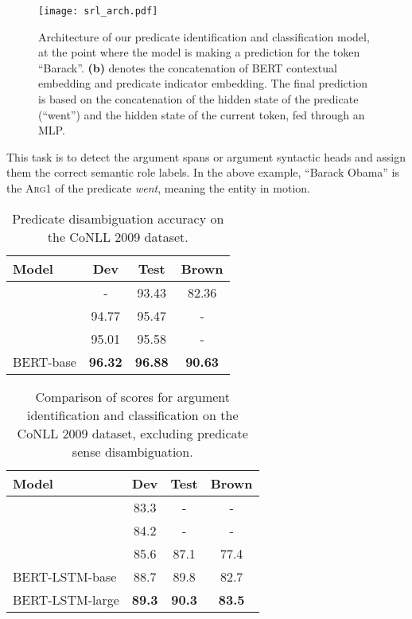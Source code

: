 \documentclass[11pt,a4paper]{article}
\begin{document}
\begin{figure}[t]
	\centering
	\texttt{[image: srl\_arch.pdf]}
	\caption{Architecture of our predicate identification and classification model, at the point where the model is making a prediction for the token ``Barack''.
		\textbf{(b)} denotes the concatenation of BERT contextual embedding and predicate indicator embedding. The final prediction is based on the concatenation of the hidden state of the predicate (``went'') and the hidden state of the current token, fed through an MLP.}
	\label{fig:srl_arch}
\end{figure}

\smallskip {}
This task is to detect the argument spans or argument syntactic heads and assign them the correct semantic role labels. 
In the above example, ``Barack Obama'' is the \textsc{Arg1} of the predicate \textit{went}, meaning the entity in motion.

\begin{table}[t]
	\centering
	\small
	\begin{tabular}{l@{\qquad}ccc}
		\toprule
		\textbf{Model}         & \textbf{Dev} & \textbf{Test} & \textbf{Brown} \\ \midrule
		\citet{shi2017joint} &  - & 93.43 & 82.36 \\
		\citet{roth2016neural} & 94.77 & 95.47 & - \\
		\citet{he2018syntax} & 95.01 & 95.58 & - \\ \midrule
		BERT-base & \textbf{96.32 }& \textbf{96.88} &  \textbf{90.63}  \\ 
		\bottomrule
	\end{tabular}
	\caption{Predicate disambiguation accuracy on the CoNLL 2009 dataset.}
	\label{res:preddis}
\end{table}

\begin{table}[t]
	\centering
	\small
	\begin{tabular}{l ccc}
		\toprule
		\textbf{Model}      &  \textbf{Dev} & \textbf{Test} & \textbf{Brown} \\ \midrule
		\citet{marcheggiani2017encoding} &  83.3 & - & - \\ 
		\citet{he2018syntax} & 84.2 & - & - \\
		\citet{shi2017joint} & 85.6 & 87.1  & 77.4  \\
		\midrule 
		BERT-LSTM-base & 88.7 & 89.8 & 82.7\\
		BERT-LSTM-large & \textbf{89.3} & \textbf{90.3} & \textbf{83.5} \\
		\bottomrule
	\end{tabular}
	\caption{Comparison of  scores for argument identification and classification on the CoNLL 2009 dataset, excluding predicate sense disambiguation.}
	\label{res:conll09_exclude}
\end{table}
\end{document}
